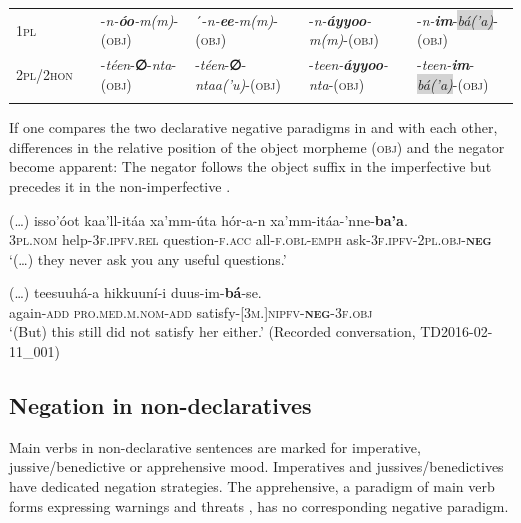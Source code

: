 \documentclass[output=paper,colorlinks,citecolor=brown,draftmode
]{langscibook}
\begin{document}
\begin{table}
\begin{tabular}{llllll}
\textsc{1pl} & & -\textit{n-\textbf{óo}-m(m)}-(\textsc{obj}) & ´-\textit{n-\textbf{ee}-m(m)}-(\textsc{obj}) & -\textit{n-\textbf{áyyoo}-m(m)}-(\textsc{obj}) & -\textit{n-\textbf{im}}-\textit{\colorbox{lightgray}{bá('a)}}-(\textsc{obj})  \\
\textsc{2pl/2hon} & & -\textit{téen}-\textbf{∅}-\textit{nta}-(\textsc{obj}) & -\textit{téen}-\textbf{∅}-\textit{ntaa('u)}-(\textsc{obj}) & -\textit{teen-\textbf{áyyoo}-nta}-(\textsc{obj}) & -\textit{teen-\textbf{im}}-\textit{\colorbox{lightgray}{bá('a)}}-(\textsc{obj})  \\
  \lspbottomrule
 \end{tabular}
\end{table}

If one compares the two declarative negative paradigms in  and  with each other, differences in the relative position of the object morpheme (\textsc{obj}) and the negator become apparent: The negator follows the object suffix in the imperfective  but precedes it in the non-imperfective .

\ea\label{ex:treis:3} 
\gll (…) 	isso’óot 		kaa’ll-itáa 			xa’mm-úta 			hór-a-n xa’mm-itáa-’nne-\textbf{ba’a}.\\
    {} \textsc{3pl.nom}	help-\textsc{3f.ipfv.rel} question-\textsc{f.acc} all-\textsc{f.obl-emph} ask-\textsc{3f.ipfv-2pl.obj-\textbf{neg}}\\
\glt ‘(…) they never ask you any useful questions.’\footnotemark{}  \citep[19]{Saint-Exupéry2018}
\z 
{}

\ea\label{ex:treis:4} 
\gll (…) teesuuhá-a hikkuuní-i duus-im-\textbf{bá}-se.\\
{} again-\textsc{add} \textsc{pro.med.m.nom-add} satisfy-[\textsc{3m.}]\textsc{nipfv-\textbf{neg}-3f.obj}\\
\glt ‘(But) this still did not satisfy her either.’ (Recorded conversation, TD2016-02-11\_001)
\z

\subsection{Negation in non-declaratives}\label{sec:treis:2.2}

Main verbs in non-declarative sentences are marked for imperative, jussive/\hspace{0pt}benedictive or apprehensive mood. Imperatives and jussives/benedictives have dedicated negation strategies. The apprehensive, a paradigm of main verb forms expressing warnings and threats \citep{TreisForthcoming}, has no corresponding negative paradigm.
\end{document}
